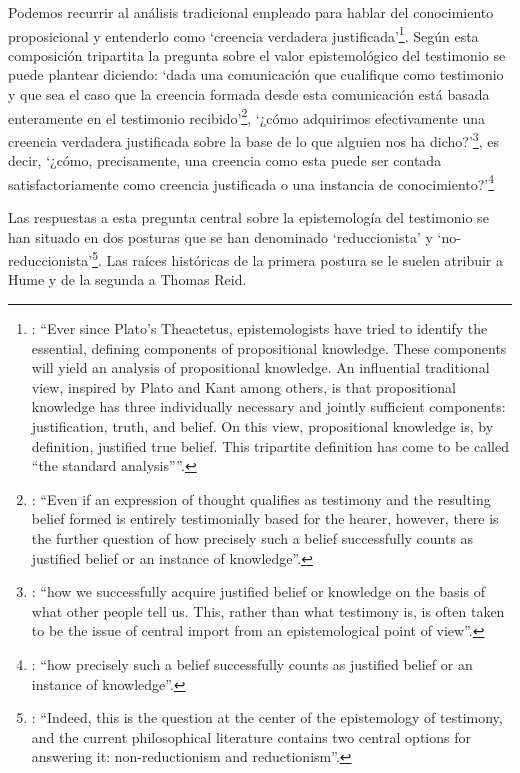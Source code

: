 Podemos recurrir al análisis tradicional empleado para hablar del conocimiento proposicional y entenderlo como \enquote*{creencia verdadera justificada}\footnote{\Cite[4]{moser2002ep}: \enquote{Ever since Plato's Theaetetus, epistemologists have tried to identify the essential, defining components of propositional knowledge. These components will yield an analysis of propositional knowledge. An influential traditional view, inspired by Plato and Kant among others, is that propositional knowledge has three individually necessary and jointly sufficient components: justification, truth, and belief. On this view, propositional knowledge is, by definition, justified true belief. This tripartite definition has come to be called ``the standard analysis''}.}. Según esta composición tripartita la pregunta sobre el valor epistemológico del testimonio se puede plantear diciendo: \enquote*{dada una comunicación que cualifique como testimonio y que sea el caso que la creencia formada desde esta comunicación está basada enteramente en el testimonio recibido}\footnote{\cite[Cf.][4]{lackeysosa2006eptest}: \enquote{Even if an expression of thought qualifies as testimony and the resulting belief formed is entirely testimonially based for the hearer, however, there is the further question of how precisely such a belief successfully counts as justified belief or an instance of knowledge}.}, \enquote*{¿cómo adquirimos efectivamente una creencia verdadera justificada sobre la base de lo que alguien nos ha dicho?}\footnote{\cite[Cf.][2]{lackeysosa2006eptest}: \enquote{how we successfully acquire justified belief or knowledge on the basis of what other people tell us. This, rather than what testimony is, is often taken to be the issue of central import from an epistemological point of view}.}, es decir, \enquote*{¿cómo, precisamente, una creencia como esta puede ser contada satisfactoriamente como creencia justificada o una instancia de conocimiento?}\footnote{\cite[Cf.][4]{lackeysosa2006eptest}: \enquote{how precisely such a belief successfully counts as justified belief or an instance of knowledge}.}

Las respuestas a esta pregunta central sobre la epistemología del testimonio se han situado en dos posturas que se han denominado `reduccionista' y `no-reduccionista'\footnote{\cite[Cf.][4]{lackeysosa2006eptest}: \enquote{Indeed, this is the question at the center of the epistemology of testimony, and the current philosophical literature contains two central options for answering it: non-reductionism and reductionism}.}. Las raíces históricas de la primera postura se le suelen atribuir a Hume y de la segunda a Thomas Reid.

